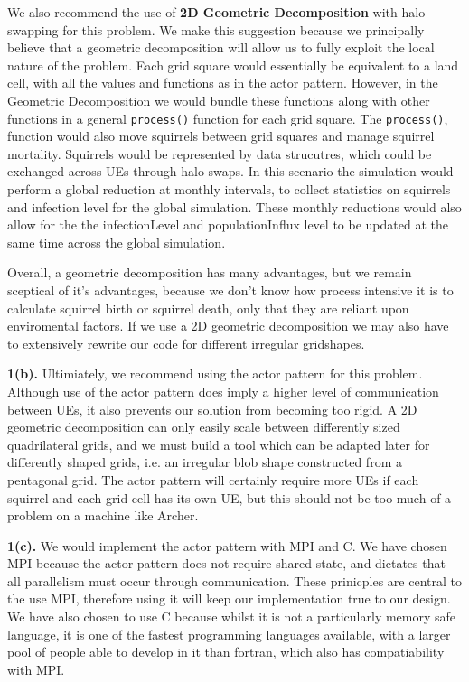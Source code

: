 \documentclass{article}
\begin{document}
We also recommend the use of \textbf{2D Geometric Decomposition} with halo swapping for this problem. We make this suggestion because we principally believe that a geometric decomposition will allow us to fully exploit the local nature of the problem. Each grid square would essentially be equivalent to a land cell, with all the values and functions as in the actor pattern. However, in the Geometric Decomposition we would bundle these functions along with other functions in a general \texttt{process()} function for each grid square. The \texttt{process()}, function would also move squirrels between grid squares and manage squirrel mortality. Squirrels would be represented by data strucutres, which could be exchanged across UEs through halo swaps. In this scenario the simulation would perform a global reduction at monthly intervals, to collect statistics on squirrels and infection level for the global simulation. These monthly reductions would also allow for the the infectionLevel and populationInflux level to be updated at the same time across the global simulation.

Overall, a geometric decomposition has many advantages, but we remain sceptical of it's advantages, because we don't know how process intensive it is to calculate squirrel birth or squirrel death, only that they are reliant upon enviromental factors. If we use a 2D geometric decomposition we may also have to extensively rewrite our code for different irregular gridshapes.  \newline

\noindent\textbf{1(b).} \newline
Ultimiately, we recommend using the actor pattern for this problem. Although use of the actor pattern does imply a higher level of communication between UEs, it also prevents our solution from becoming too rigid. A 2D geometric decomposition can only easily scale between differently sized quadrilateral grids, and we must build a tool which can be adapted later for differently shaped grids, i.e. an irregular blob shape constructed from a pentagonal grid. The actor pattern will certainly require more UEs if each squirrel and each grid cell has its own UE, but this should not be too much of a problem on a machine like Archer. \newline

\noindent\textbf{1(c).} \newline
We would implement the actor pattern with MPI and C. We have chosen MPI because the actor pattern does not require shared state, and dictates that all parallelism must occur through communication. These prinicples are central to the use MPI, therefore using it will keep our implementation true to our design. We have also chosen to use C because whilst it is not a particularly memory safe language, it is one of the fastest programming languages available, with a larger pool of people able to develop in it than fortran, which also has compatiability with MPI.
\end{document}
